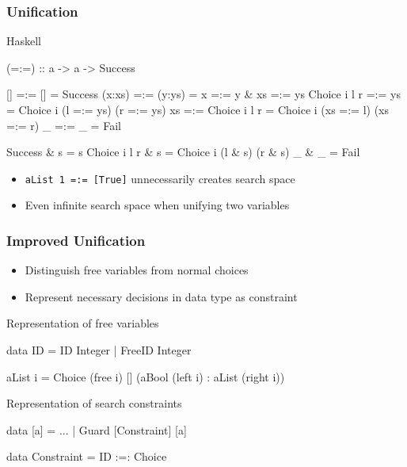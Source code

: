 \documentclass[utf8]{beamer}
\newenvironment{program}{\begin{semiverbatim}\small}{\end{semiverbatim}}
\begin{document}
\begin{frame}[fragile]
\frametitle{Unification}
\begin{block}{Haskell}
\begin{program}
(=:=) :: a -> a -> Success

[]           =:= []           = Success
(x:xs)       =:= (y:ys)       = x =:= y \& xs =:= ys
Choice i l r =:= ys           = Choice i (l =:= ys) (r =:= ys)
xs           =:= Choice i l r = Choice i (xs =:= l) (xs =:= r)
_            =:= _            = Fail

Success      \& s = s
Choice i l r \& s = Choice i (l \& s) (r \& s)
_            \& _ = Fail
\end{program}
\end{block}
\begin{itemize}
 \item  \verb!aList 1 =:= [True]! unnecessarily creates search space
 \item Even infinite search space when unifying two variables
\end{itemize}
\end{frame}

\begin{frame}[fragile]
\frametitle{Improved Unification}

\begin{itemize}
\item Distinguish free variables from normal choices  
\item Represent necessary decisions in data type as constraint
\end{itemize}

\begin{block}{Representation of free variables}
\begin{program}
data ID = ID Integer | FreeID Integer

aList i = Choice (free i) [] (aBool (left i) : aList (right i))
\end{program}
\end{block}

\begin{block}{Representation of search constraints}
\begin{program}
data [a] = ... | Guard [Constraint] [a]

data Constraint = ID :=: Choice
\end{program}
\end{block}
\end{frame}
\end{document}
